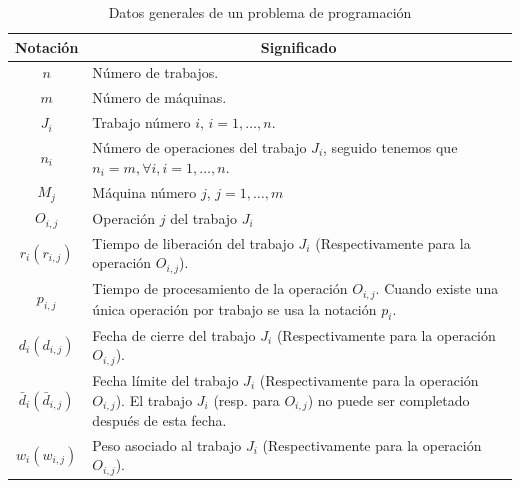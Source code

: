 \documentclass[spanish,draft,12pt,headsepline,footsepline,paper=letter]{scrreprt}
\begin{document}
\begin{table}
\centering
\begin{tabular}{c p{12cm}}
\toprule
\multicolumn{1}{c}{Notación} & \multicolumn{1}{c}{Significado} \\
  \midrule
  $n$                         & Número de trabajos.                                                                                                                                                  \\
  $m$                         & Número de máquinas.                                                                                                                                                  \\
  $J_i$                       & Trabajo número $i$, $i=1,\dots,n$.                                                                                                                                   \\
  $n_i$                       & Número de operaciones del trabajo $J_i$, seguido tenemos que $n_i=m, \forall i, i=1,\dots,n$.                                                                        \\
  $M_j$                       & Máquina número $j$, $j=1,\dots,m$                                                                                                                                    \\
  $O_{i,j}$                   & Operación $j$ del trabajo $J_i$                                                                                                                                      \\
  $r_i (r_{i,j})$             & Tiempo de liberación del trabajo $J_i$ (Respectivamente para la operación $O_{i,j}$).                                                                                \\
  $p_{i,j}$                   & Tiempo de procesamiento de la operación $O_{i,j}$. Cuando existe una única operación por trabajo se usa la notación $p_i$.                                           \\
  $d_i (d_{i,j})$             & Fecha de cierre del trabajo $J_i$ (Respectivamente para la operación $O_{i,j}$).                                                                                     \\
  $\bar{d}_i (\bar{d}_{i,j})$ & Fecha límite del trabajo $J_i$ (Respectivamente para la operación $O_{i,j}$). El trabajo $J_i$ (resp. para $O_{i,j}$) no puede ser completado después de esta fecha. \\
  $w_i (w_{i,j})$             & Peso asociado al trabajo $J_i$ (Respectivamente para la operación $O_{i,j}$).                                                                                        \\
  \bottomrule
\end{tabular}
\caption{Datos generales de un problema de programación}
  \label{tab:problem_data}
\end{table}
\end{document}
